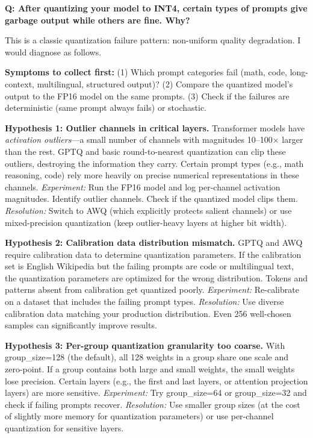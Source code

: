 \begin{interviewq}
\textbf{Q: After quantizing your model to INT4, certain types of prompts give garbage output while others are fine. Why?}

 \quad {} \quad \badgefreq{\freqmed}

\stronganswer

This is a classic quantization failure pattern: non-uniform quality degradation. I would diagnose as follows.

\textbf{Symptoms to collect first:} (1) Which prompt categories fail (math, code, long-context, multilingual, structured output)? (2) Compare the quantized model's output to the FP16 model on the same prompts. (3) Check if the failures are deterministic (same prompt always fails) or stochastic.

\textbf{Hypothesis 1: Outlier channels in critical layers.} Transformer models have \textit{activation outliers}---a small number of channels with magnitudes 10--100$\times$ larger than the rest. GPTQ and basic round-to-nearest quantization can clip these outliers, destroying the information they carry. Certain prompt types (e.g., math reasoning, code) rely more heavily on precise numerical representations in these channels. \textit{Experiment:} Run the FP16 model and log per-channel activation magnitudes. Identify outlier channels. Check if the quantized model clips them. \textit{Resolution:} Switch to AWQ (which explicitly protects salient channels) or use mixed-precision quantization (keep outlier-heavy layers at higher bit width).

\textbf{Hypothesis 2: Calibration data distribution mismatch.} GPTQ and AWQ require calibration data to determine quantization parameters. If the calibration set is English Wikipedia but the failing prompts are code or multilingual text, the quantization parameters are optimized for the wrong distribution. Tokens and patterns absent from calibration get quantized poorly. \textit{Experiment:} Re-calibrate on a dataset that includes the failing prompt types. \textit{Resolution:} Use diverse calibration data matching your production distribution. Even 256 well-chosen samples can significantly improve results.

\textbf{Hypothesis 3: Per-group quantization granularity too coarse.} With group\_size=128 (the default), all 128 weights in a group share one scale and zero-point. If a group contains both large and small weights, the small weights lose precision. Certain layers (e.g., the first and last layers, or attention projection layers) are more sensitive. \textit{Experiment:} Try group\_size=64 or group\_size=32 and check if failing prompts recover. \textit{Resolution:} Use smaller group sizes (at the cost of slightly more memory for quantization parameters) or use per-channel quantization for sensitive layers.


\end{interviewq}
